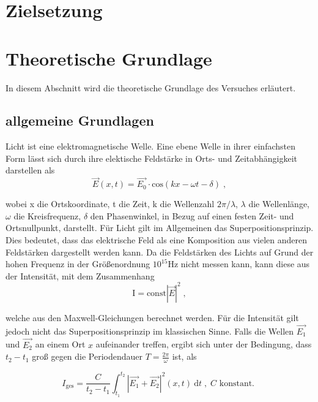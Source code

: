 \section{Zielsetzung}

\section{Theoretische Grundlage}
\noindent
In diesem Abschnitt wird die theoretische Grundlage des Versuches erläutert.  
\subsection{allgemeine Grundlagen}
Licht ist eine elektromagnetische Welle. Eine ebene Welle in ihrer einfachsten Form lässt sich durch ihre elektische Feldstärke in Orts- und Zeitabhängigkeit darstellen als
\begin{equation}
    \vec{E}(x, t) = \vec{E_0} \cdot \text{cos}(kx - \omega t - \delta) \; , 
    \label{eqn:ansatz}
\end{equation}

\noindent
wobei x die Ortskoordinate, t die Zeit, k die Wellenzahl $2 \pi/\lambda$, $\lambda$ die Wellenlänge, $\omega$ die Kreisfrequenz, $\delta$ den Phasenwinkel, in Bezug auf einen festen Zeit- und Ortsnullpunkt, darstellt.
Für Licht gilt im Allgemeinen das Superpositionsprinzip. Dies bedeutet, dass das elektrische Feld als eine Komposition aus vielen anderen Feldstärken dargestellt werden kann.
Da die Feldstärken des Lichts auf Grund der hohen Frequenz in der Größenordnung $10^{15} \si{\hertz}$ nicht messen kann, kann diese aus der Intensität, mit dem Zusammenhang
\begin{equation*}
    \text{I} = \text{const} |\vec{E}|^2 \; ,
    \label{eqn:Int}
\end{equation*}

\noindent
welche aus den Maxwell-Gleichungen berechnet werden. Für die Intensität gilt jedoch nicht das Superpositionsprinzip im klassischen Sinne. Falls die Wellen $\vec{E_1}$ und $\vec{E_2}$ 
an einem Ort $x$  aufeinander treffen, ergibt sich unter der Bedingung, dass $t_2 - t_1$ groß gegen die Periodendauer $T = \frac{2 \pi}{\omega}$ ist, als

\begin{equation}
    I_\text{ges} = \frac{C}{t_2 - t_1} \int^{t_2}_{t_1} |\vec{E_1} + \vec{E_2}|^2 (x, t) \: \text{d}t 
    \; , \; C \text{ konstant. } 
\end{equation}

